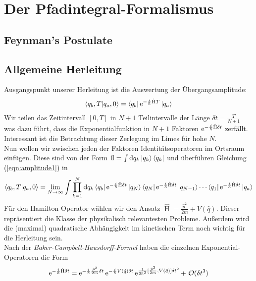 \section{Der Pfadintegral-Formalismus}

\subsection{Feynman's Postulate}
\subsection{Allgemeine Herleitung}
Ausgangspunkt unserer Herleitung ist die Auswertung der Übergangsamplitude:
\begin{align}
	\braket{q_b,T}{q_a,0} = \bra{q_b}\operatorname{e}^{-\frac{i}{\hbar}\hat{\operatorname{H}}T}\ket{q_a} \label{eqn:amplitude1}
\end{align}
Wir teilen das Zeitintervall $[0,T]$ in $N+1$ Teilintervalle der Länge $\delta t = \frac{T}{N+1}$ was dazu führt, dass die Exponentialfunktion in $N+1$ Faktoren $\operatorname{e}^{-\frac{i}{\hbar}\hat{\operatorname{H}}\delta t}$ zerfällt. Interessant ist die Betrachtung dieser Zerlegung im Limes für hohe $N$. \\
Nun wollen wir zwischen jeden der Faktoren Identitätsoperatoren im Ortsraum einfügen. Diese sind von der Form 
	$\mathrm{1\!l} = \int \dd q_k \ket{q_k}\bra{q_k}$ und überführen Gleichung (\ref{eqn:amplitude1}) in 
\begin{align}
	\braket{q_b,T}{q_a,0} = \lim_{N\rightarrow\infty} \int \prod_{k=1}^{N} \dd q_k \bra{q_b}\operatorname{e}^{-\frac{i}{\hbar}\hat{\operatorname{H}}\delta t}\ket{q_N}\bra{q_N}\operatorname{e}^{-\frac{i}{\hbar}\hat{\operatorname{H}}\delta t}\ket{q_{N-1}} \cdots \bra{q_1}\operatorname{e}^{-\frac{i}{\hbar}\hat{\operatorname{H}}\delta t}\ket{q_a} \label{eqn:amplitude2}
\end{align}
Für den Hamilton-Operator wählen wir den Ansatz $\hat{\operatorname{H}} = \frac{\hat{p}^2}{2m} + V(\hat{q})$. Dieser repräsentiert die Klasse der physikalisch relevantesten Probleme. Außerdem wird die (maximal) quadratische Abhängigkeit im kinetischen Term noch wichtig für die Herleitung sein.\\
Nach der \textit{Baker-Campbell-Hausdorff-Formel} haben die einzelnen Exponential-Operatoren die Form
\begin{align}
	\operatorname{e}^{-\frac{i}{\hbar}\hat{\operatorname{H}}\delta t} = \operatorname{e}^{-\frac{i}{\hbar}\frac{\hat{p}^2}{2m}\delta t}\operatorname{e}^{-\frac{i}{\hbar} V(\hat{q})\delta t}\operatorname{e}^{\frac{1}{2\hbar^2}[\frac{\hat{p}^2}{2m},V(\hat{q})]\delta t^2} + \ \mathcal{O}(\delta t^3)
\end{align}
